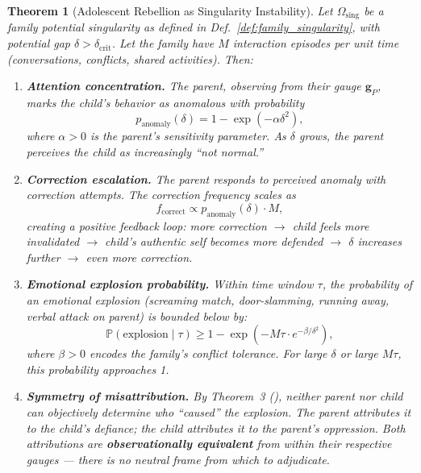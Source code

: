 \documentclass[11pt,a4paper]{article}
\newtheorem{theorem}{Theorem}[section]
\newcommand{\Pbb}{\mathbb{P}}
\begin{document}
\begin{theorem}[Adolescent Rebellion as Singularity Instability]
\label{thm:adolescent_rebellion}
Let $\Omega_{\text{sing}}$ be a family potential singularity as defined in Def.~\ref{def:family_singularity}, with potential gap $\delta > \delta_{\text{crit}}$. Let the family have $M$ interaction episodes per unit time (conversations, conflicts, shared activities). Then:

\begin{enumerate}[label=(\roman*)]
    \item \textbf{Attention concentration.} The parent, observing from their gauge $\mathbf{g}_P$, marks the child's behavior as anomalous with probability
    \begin{equation}
        p_{\text{anomaly}}(\delta) = 1 - \exp(-\alpha \delta^2),
    \end{equation}
    where $\alpha > 0$ is the parent's sensitivity parameter. As $\delta$ grows, the parent perceives the child as increasingly ``not normal.''

    \item \textbf{Correction escalation.} The parent responds to perceived anomaly with correction attempts. The correction frequency scales as
    \begin{equation}
        f_{\text{correct}} \propto p_{\text{anomaly}}(\delta) \cdot M,
    \end{equation}
    creating a positive feedback loop: more correction $\to$ child feels more invalidated $\to$ child's authentic self becomes more defended $\to$ $\delta$ increases further $\to$ even more correction.

    \item \textbf{Emotional explosion probability.} Within time window $\tau$, the probability of an emotional explosion (screaming match, door-slamming, running away, verbal attack on parent) is bounded below by:
    \begin{equation}
        \Pbb(\text{explosion} \mid \tau) \geq 1 - \exp\left(-M\tau \cdot e^{-\beta/\delta^2}\right),
    \end{equation}
    where $\beta > 0$ encodes the family's conflict tolerance. For large $\delta$ or large $M\tau$, this probability approaches 1.

    \item \textbf{Symmetry of misattribution.} By Theorem~3 (), neither parent nor child can objectively determine who ``caused'' the explosion. The parent attributes it to the child's defiance; the child attributes it to the parent's oppression. Both attributions are \textbf{observationally equivalent} from within their respective gauges — there is no neutral frame from which to adjudicate.
\end{enumerate}
\end{theorem}
\end{document}
